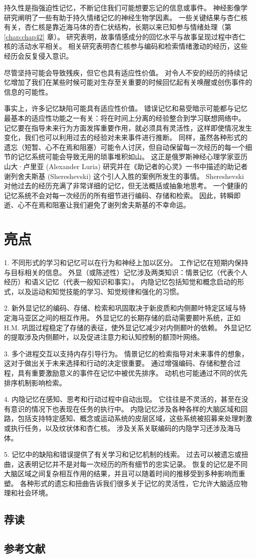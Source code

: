 持久性是指强迫性记忆，不断记住我们可能想要忘记的信息或事件。 神经影像学研究阐明了一些有助于持久情绪记忆的神经生物学因素。 一些关键结果与杏仁核有关，杏仁核是靠近海马体的杏仁状结构，长期以来已知参与情绪处理（第 \ref{chap:chap42} 章）。 研究表明，故事情感成分的回忆水平与故事呈现过程中杏仁核的活动水平相关。 相关研究表明杏仁核参与编码和检索情绪激动的经历，这些经历会反复侵入意识。

尽管坚持可能会导致残疾，但它也具有适应性价值。 对令人不安的经历的持续记忆增加了我们在某些时候可能对生存至关重要的时候回忆起有关唤醒或创伤事件的信息的可能性。

事实上，许多记忆缺陷可能具有适应性价值。 错误记忆和易受暗示可能都与记忆最基本的适应性功能之一有关：将在时间上分离的经验整合到学习联想网络中。 记忆要在指导未来行为方面发挥重要作用，就必须具有灵活性，这样即使情况发生变化，我们也可以利用过去的经验对未来事件进行推断。 同样，虽然各种形式的遗忘（短暂、心不在焉和阻塞）可能令人讨厌，但自动保留每一次经历的每一个细节的记忆系统可能会导致无用的琐事堆积如山。 这正是俄罗斯神经心理学家亚历山大·卢里亚 (Alexander Luria) 研究并在《助记者的心灵》一书中描述的助记者谢列舍夫斯基 (Shereshevski) 这个引人入胜的案例所发生的事情。 Shereshevski 对他过去的经历充满了非常详细的记忆，但无法概括或抽象地思考。 一个健康的记忆系统不会对每一次经历的所有细节进行编码、存储和检索。 因此，转瞬即逝、心不在焉和阻塞让我们避免了谢列舍夫斯基的不幸命运。


\section{亮点}

1. 不同形式的学习和记忆可以在行为和神经上加以区分。 工作记忆在短期内保持与目标相关的信息。 外显（或陈述性）记忆涉及两类知识：情景记忆（代表个人经历）和语义记忆（代表一般知识和事实）。 内隐记忆包括知觉和概念启动的形式，以及运动和知觉技能的学习、知觉规律和强化的习惯。 

2. 新外显记忆的编码、存储、检索和巩固取决于新皮质和内侧颞叶特定区域与特定海马亚区之间的相互作用。 外显记忆的长期存储的启动需要颞叶系统，正如 H.M. 巩固过程稳定了存储的表征，使外显记忆减少对内侧颞叶的依赖。 外显记忆的提取涉及内侧颞叶，以及促进注意力和认知控制的额顶叶网络。 

3. 多个进程交互以支持内存引导行为。 情景记忆的检索指导对未来事件的想象，这对于做出关于未来选择和行动的决定很重要。 通过增强编码、存储和整合过程，具有重要激励意义的事件在记忆中被优先排序。 动机也可能通过不同的优先排序机制影响检索。 

4. 内隐记忆在感知、思考和行动过程中自动出现。 它往往是不灵活的，甚至在没有意识的情况下也表现在任务的执行中。 内隐记忆涉及各种各样的大脑区域和回路，包括支持特定感知、概念或运动系统的皮层区域，这些系统被招募来处理刺激或执行任务，以及纹状体和杏仁核。 涉及关系关联编码的内隐学习还涉及海马体。 

5. 记忆中的缺陷和错误提供了有关学习和记忆机制的线索。 过去可以被遗忘或扭曲，这表明记忆并不是对每一次经历的所有细节的忠实记录。 恢复的记忆是不同大脑区域之间复杂相互作用的结果，并且可以随着时间的推移受到多种影响而重塑。 各种形式的遗忘和扭曲告诉我们很多关于记忆的灵活性，它允许大脑适应物理和社会环境。
\subsection{荐读}
\subsection{参考文献}